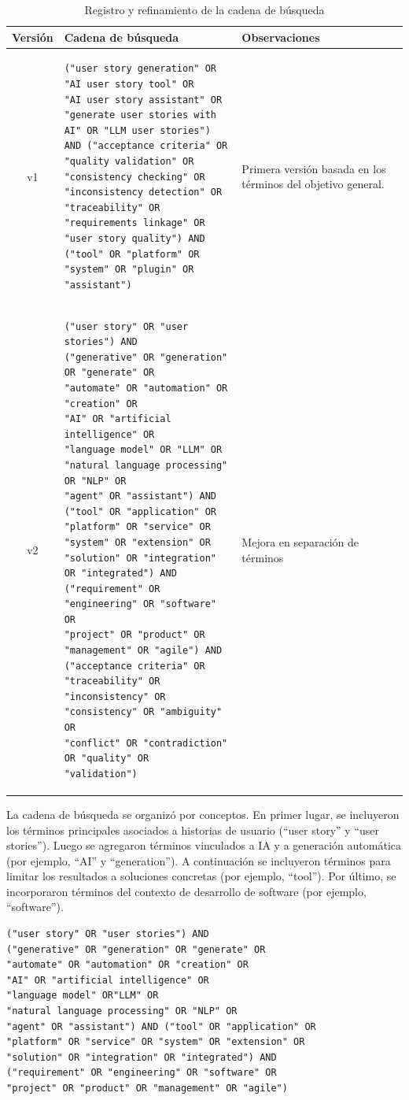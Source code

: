 \newpage
\begin{longtable}{|c|p{10cm}|p{3cm}|}
\caption{Registro y refinamiento de la cadena de búsqueda}
\label{table:cadenas-busqueda} \\
\hline
\textbf{Versión} & \textbf{Cadena de búsqueda} & \textbf{Observaciones} \\
\hline
v1 & 
\begin{verbatim} 
("user story generation" OR "AI user story tool" OR
"AI user story assistant" OR
"generate user stories with AI" OR "LLM user stories")
AND ("acceptance criteria" OR "quality validation" OR
"consistency checking" OR "inconsistency detection" OR
"traceability" OR "requirements linkage" OR
"user story quality") AND ("tool" OR "platform" OR
"system" OR "plugin" OR "assistant")

\end{verbatim}
& Primera versión basada en los términos del objetivo general. \\
\hline
v2 & 
\begin{verbatim} 
("user story" OR "user stories") AND
("generative" OR "generation" OR "generate" OR
"automate" OR "automation" OR "creation" OR 
"AI" OR "artificial intelligence" OR 
"language model" OR "LLM" OR
"natural language processing" OR "NLP" OR
"agent" OR "assistant") AND ("tool" OR "application" OR
"platform" OR "service" OR "system" OR "extension" OR
"solution" OR "integration" OR "integrated") AND
("requirement" OR "engineering" OR "software" OR
"project" OR "product" OR "management" OR "agile") AND
("acceptance criteria" OR "traceability" OR
"inconsistency" OR "consistency" OR "ambiguity" OR
"conflict" OR "contradiction" OR "quality" OR
"validation")

\end{verbatim}
& Mejora en separación de términos \\
\hline
\end{longtable}

La cadena de búsqueda se organizó por conceptos. En primer lugar, se incluyeron los términos principales asociados a historias de usuario (``user story'' y ``user stories''). Luego se agregaron términos vinculados a IA y a generación automática (por ejemplo, ``AI'' y ``generation''). A continuación se incluyeron términos para limitar los resultados a soluciones concretas (por ejemplo, ``tool''). Por último, se incorporaron términos del contexto de desarrollo de software (por ejemplo, ``software'').

\begin{verbatim} 
("user story" OR "user stories") AND
("generative" OR "generation" OR "generate" OR
"automate" OR "automation" OR "creation" OR 
"AI" OR "artificial intelligence" OR 
"language model" OR"LLM" OR
"natural language processing" OR "NLP" OR
"agent" OR "assistant") AND ("tool" OR "application" OR
"platform" OR "service" OR "system" OR "extension" OR
"solution" OR "integration" OR "integrated") AND
("requirement" OR "engineering" OR "software" OR
"project" OR "product" OR "management" OR "agile")
\end{verbatim}


